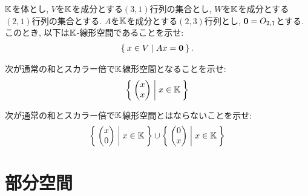 \begin{quiz}
  $\mathbb{K}$を体とし,
  $V$を$\mathbb{K}$を成分とする$(3,1)$行列の集合とし,
  $W$を$\mathbb{K}$を成分とする$(2,1)$行列の集合とする.
  $A$を$\mathbb{K}$を成分とする$(2,3)$行列とし,
  $\boldsymbol{0}=O_{2,1}$とする.
  このとき, 以下は$\mathbb{K}$-線形空間であることを示せ:
  \begin{align*}
    \Set{x\in V|Ax=\boldsymbol{0}}.
  \end{align*}
\end{quiz}

\begin{quiz}
  次が通常の和とスカラー倍で$\mathbb{K}$線形空間となることを示せ:
  \begin{align*}
    \Set{\begin{pmatrix}x\\x\end{pmatrix}|x\in\mathbb{K}}
  \end{align*}
\end{quiz}

\begin{quiz}
  次が通常の和とスカラー倍で$\mathbb{K}$線形空間とはならないことを示せ:
  \begin{align*}
    \Set{\begin{pmatrix}x\\0\end{pmatrix}|x\in\mathbb{K}}
    \cup \Set{\begin{pmatrix}0\\x\end{pmatrix}|x\in\mathbb{K}}
  \end{align*}
\end{quiz}

\chapter{部分空間}
\label{chap:subspace}
